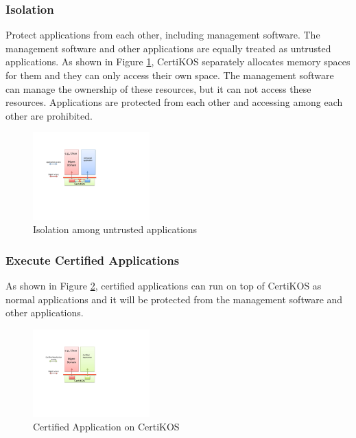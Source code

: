 \documentclass[a4paper,12pt]{article}
\begin{document}
\subsubsection{Isolation}

Protect applications from each other, including management software.  The management software and other applications are equally treated as untrusted applications. As shown in Figure \ref{fig:isolation}, CertiKOS separately allocates memory spaces for them  and they can only access their own space.  The management software can manage the ownership of these resources, but it can not access these resources.   Applications are protected from each other and accessing among each other are prohibited.
\begin{figure}[!ht]
 \centerline{
 \includegraphics[width=0.4\textwidth]{certikos_isolation}}
 \caption{Isolation among untrusted applications} \label{fig:isolation}
\end{figure}

\subsubsection{Execute Certified Applications}
As shown in Figure \ref{fig:certified_ap}, certified applications can run on top of CertiKOS as normal applications and it will be protected from the management software and other applications.

\begin{figure}[!ht]
 \centerline{
 \includegraphics[width=0.4\textwidth]{certikos_certified_ap}}
 \caption{Certified Application on CertiKOS} \label{fig:certified_ap}
\end{figure}
\end{document}

